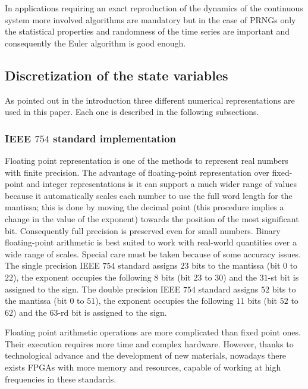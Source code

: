 In applications requiring an exact reproduction of the dynamics of
the continuous system more involved algorithms are mandatory but
in the case of PRNGs only the statistical properties and
randomness of the time series are important and consequently the
Euler algorithm is good enough.

\subsection{Discretization of the state variables}
\label{sec:numrepre}
As pointed out in the introduction three different numerical
representations are used in this paper. Each one is described in
the following subsections.
\subsubsection{IEEE $754$ standard implementation}
\label{sec:impleFloat} Floating point representation is one of the
methods to represent real numbers with finite precision. The
advantage of floating-point representation over fixed-point and
integer representations is it can support a much wider range of
values because it automatically scales each number to use the full
word length for the mantissa; this is done by moving the decimal
point (this procedure implies a change in the value of the
exponent) towards the position of the most significant bit.
Consequently full precision is preserved even for small numbers.
Binary floating-point arithmetic is best suited to work
 with real-world quantities over a wide range of
scales. Special care must be taken because of some accuracy issues. %
%
The single precision IEEE $754$ standard assigns $23$ bits to the
mantissa (bit $0$ to $22$), the exponent occupies the following
$8$ bits (bit $23$ to $30$) and the $31$-st bit is assigned to the
sign. The double precision IEEE $754$ standard assigns $52$ bits to the
mantissa (bit $0$ to $51$), the exponent occupies the following
$11$ bits (bit $52$ to $62$) and the $63$-rd bit is assigned to the
sign.

Floating point arithmetic operations are more complicated than
fixed point ones. Their execution requires more time and complex
hardware. However, thanks to technological advance and the
development of new materials, nowadays there exists FPGAs with
more memory and resources, capable of working at high frequencies in these standards.

